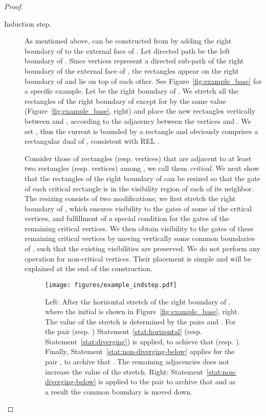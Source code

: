 \documentclass{llncs}
\begin{document}
\begin{proof}
\begin{description}
\item[Induction step.] As mentioned above,   can be constructed from  by adding the right boundary of  to the external face of . Let directed path  be the left boundary of . Since vertices  represent a directed sub-path of the right boundary of the external face of , the rectangles  appear on the right boundary of  and lie on top of each other. See Figure~\ref{fig:example_base} for a specific example.  Let  be the right boundary of . We stretch all the rectangles of the right boundary of  except for  by the same value (Figure~\ref{fig:example_base}, right) and place the new rectangles   vertically between  and , according to the adjacency between the vertices  and . We set , thus the current  is bounded by a rectangle and obviously comprises a rectangular dual of , consistent with REL . 

Consider those of rectangles (resp. vertices)  that are adjacent to at least two rectangles (resp. vertices) among , we call them \emph{critical}.   We next show that the rectangles of the right boundary of  can be resized so that the gate of each critical rectangle is in the visibility region of each of its neighbor.  The resizing consists of two modifications; we first stretch the right boundary of , which ensures visibility to the gates of some of the critical vertices, and fulfillment of a special condition for the gates of the remaining critical vertices. We then obtain visibility to the gates of these remaining critical vertices by moving vertically some common boundaries of , such that the existing visibilities are preserved.  We do not perform any operation for non-critical vertices. Their placement is simple and will be explained at the end of the construction.

\begin{figure}[htb]
\centering
\texttt{[image: figures/example\_indstep.pdf]}
\caption{\small Left:  After the horizontal stretch of the right boundary of , where the initial  is shown in Figure~\ref{fig:example_base}, right. The value of the stretch is determined by the pairs  and . For the pair  (resp. )  Statement~\ref{stat:horizontal} (resp. Statement~\ref{stat:diverging}) is applied, to achieve that  (resp. ).  Finally, Statement~\ref{stat:non-diverging-below} applies for the pair , to archive that .  The remaining adjacencies does not increase the value of the stretch. Right: Statement~\ref{stat:non-diverging-below} is applied to the pair  to archive that   and as a result the common boundary  is moved down.}
\label{fig:example_indstep} 
\end{figure}


\end{description}
\end{proof}
\end{document}
